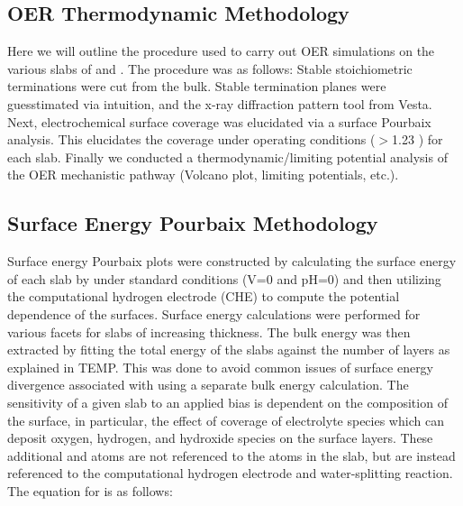 \subsection{OER Thermodynamic Methodology}  %
%
%
Here we will outline the procedure used to carry out OER simulations on the various slabs of \IrOtwo and \IrOthree.
%
The procedure was as follows:
%
Stable stoichiometric terminations were cut from the bulk.
%
Stable termination planes were guesstimated via intuition, and the x-ray diffraction pattern tool from Vesta.
%
Next, electrochemical surface coverage was elucidated via a surface Pourbaix analysis.
%
This elucidates the coverage under operating conditions ($>$\num{1.23} \VRHE) for each slab.
%
Finally we conducted a thermodynamic/limiting potential analysis of the OER mechanistic pathway (Volcano plot, limiting potentials, etc.).


\subsection{Surface Energy Pourbaix Methodology}  %
%
%
Surface energy Pourbaix plots were constructed by calculating the surface energy of each slab by under standard conditions (\si{\volt}\num{=0} and pH\num{=0}) and then utilizing the computational hydrogen electrode (CHE) to compute the potential dependence of the surfaces.
%
Surface energy calculations were performed for various facets for slabs of increasing thickness.
%
The bulk energy was then extracted by fitting the total energy of the slabs against the number of layers as explained in TEMP.
%
This was  done to avoid common issues of surface energy divergence associated with using a separate bulk energy calculation.
%
The sensitivity of a given slab to an applied bias is dependent on the composition of the surface,
in particular, the effect of coverage of electrolyte species which can deposit oxygen, hydrogen, and hydroxide species on the surface layers.
%
These additional  and  atoms are not referenced to the atoms in the slab, but are instead referenced to the computational hydrogen electrode and water-splitting reaction.
%
The equation for is as follows:


